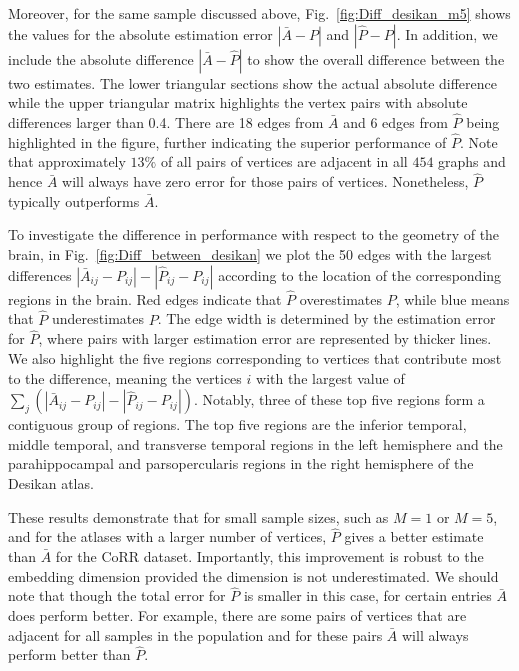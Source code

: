 \documentclass[10pt,letterpaper]{article}
\renewcommand{\hat}{\widehat}
\begin{document}
Moreover, for the same sample discussed above, Fig.~\ref{fig:Diff_desikan_m5} shows the values for the absolute estimation error $|\bar{A} - P|$ and $|\hat{P}-P|$. In addition, we include the absolute difference $|\bar{A} - \hat{P}|$ to show the overall difference between the two estimates. The lower triangular sections show the actual absolute difference while the upper triangular matrix highlights the vertex pairs with absolute differences larger than 0.4. 
There are 18 edges from $\bar{A}$ and 6 edges from $\hat{P}$ being highlighted in the figure, further indicating the superior performance of $\hat{P}$.
Note that approximately $13\%$ of all pairs of vertices are adjacent in all $454$ graphs and hence $\bar{A}$ will always have zero error for those pairs of vertices.
Nonetheless, $\hat{P}$ typically outperforms $\bar{A}$.

To investigate the difference in performance with respect to the geometry of the brain, 
in Fig.~\ref{fig:Diff_between_desikan} we plot the 50 edges with the largest differences $|\bar{A}_{ij} - P_{ij}| - |\hat{P}_{ij} - P_{ij}|$ according to the location of the corresponding regions in the brain. Red edges indicate that $\hat{P}$ overestimates $P$, while blue means that $\hat{P}$ underestimates $P$. The edge width is determined by the estimation error for $\hat{P}$, where pairs with larger estimation error are represented by thicker lines.
We also highlight the five regions corresponding to vertices that contribute most to the difference, meaning the vertices $i$ with the largest value of $\sum_j (|\bar{A}_{ij} - P_{ij}| - |\hat{P}_{ij} - P_{ij}|)$.
Notably, three of these top five regions form a contiguous group of regions.
The top five regions are the inferior temporal, middle temporal, and transverse temporal regions in the left hemisphere and the parahippocampal and parsopercularis regions in the right hemisphere of the Desikan atlas.

These results demonstrate that for small sample sizes, such as $M=1$ or $M=5$, and for the atlases with a larger number of vertices, $\hat{P}$ gives a better estimate than $\bar{A}$ for the CoRR dataset.
Importantly, this improvement is robust to the embedding dimension provided the dimension is not underestimated.
We should note that though the total error for $\hat{P}$ is smaller in this case, for certain entries $\bar{A}$ does perform better.
For example, there are some pairs of vertices that are adjacent for all samples in the population and for these pairs $\bar{A}$ will always perform better than $\hat{P}$. 
\end{document}
